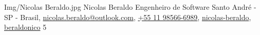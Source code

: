 \begin{Header}
	{Img/Nicolas Beraldo.jpg} %
	{Nicolas Beraldo} %
	{Engenheiro de Software} %
	{ %
		 Santo André - SP - Brasil,
		 \href{mailto:nicolas.beraldo@outlook.com}{nicolas.beraldo@outlook.com},
		 \href{tel:+55 11 98566-6989}{+55 11 98566-6989},
		 \href{https://www.linkedin.com/in/nicolas-beraldo}{nicolas-beraldo},
		 \href{https://github.com/beraldonico}{beraldonico}
	}{5} %
\end{Header}